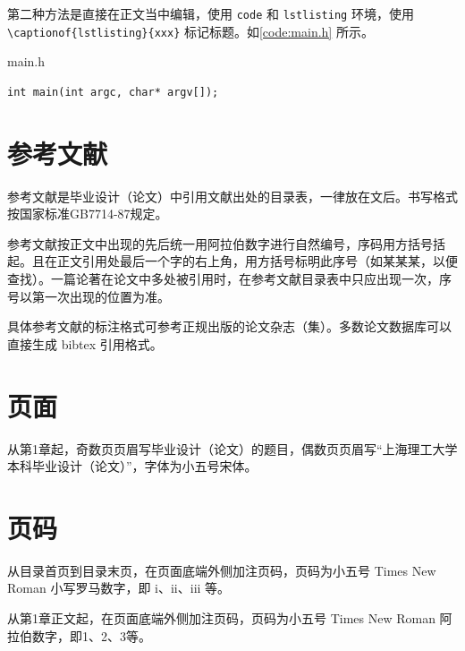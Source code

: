 \par 第二种方法是直接在正文当中编辑，使用 \lstinline|code| 和 \lstinline|lstlisting| 环境，使用 \lstinline|\captionof{lstlisting}{xxx}| 标记标题。如\autoref{code:main.h} 所示。
\begin{code}
\caption{main.h}
\label{code:main.h}
\begin{lstlisting}
int main(int argc, char* argv[]);
\end{lstlisting}
\end{code}

\section{参考文献}

\par 参考文献是毕业设计（论文）中引用文献出处的目录表，一律放在文后。书写格式按国家标准GB7714-87规定。
\par 参考文献按正文中出现的先后统一用阿拉伯数字进行自然编号，序码用方括号括起。且在正文引用处最后一个字的右上角，用方括号标明此序号（如某某某\cite{论文}，以便查找）。一篇论著在论文中多处被引用时，在参考文献目录表中只应出现一次，序号以第一次出现的位置为准。
\par 具体参考文献的标注格式可参考正规出版的论文杂志（集）。多数论文数据库可以直接生成 bibtex 引用格式。

\section{页面}
\par 从第1章起，奇数页页眉写毕业设计（论文）的题目，偶数页页眉写“上海理工大学本科毕业设计（论文）”，字体为小五号宋体。

\section{页码}
\par 从目录首页到目录末页，在页面底端外侧加注页码，页码为小五号 Times New Roman 小写罗马数字，即 i、ii、iii 等。
\par 从第1章正文起，在页面底端外侧加注页码，页码为小五号 Times New Roman 阿拉伯数字，即1、2、3等。

